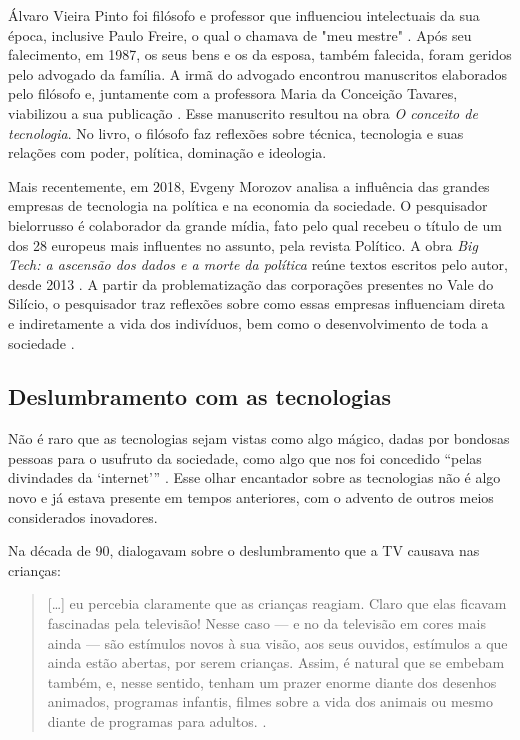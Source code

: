 \documentclass[portuguese]{textolivre}
\begin{document}
Álvaro Vieira Pinto foi filósofo e professor que influenciou intelectuais da sua época, inclusive Paulo Freire, o qual o chamava de "meu mestre" \cite[p. 1]{pinto_o_2005}. Após seu falecimento, em 1987, os seus bens e os da esposa, também falecida, foram geridos pelo advogado da família. A irmã do advogado encontrou manuscritos elaborados pelo filósofo e, juntamente com a professora Maria da Conceição Tavares, viabilizou a sua publicação \cite{pinto_o_2005}. Esse manuscrito resultou na obra \emph{O conceito de tecnologia}. No livro, o filósofo faz reflexões sobre técnica, tecnologia e suas relações com poder, política, dominação e ideologia.

Mais recentemente, em 2018, Evgeny Morozov analisa a influência das grandes empresas de tecnologia na política e na economia da sociedade. O pesquisador bielorrusso é colaborador da grande mídia, fato pelo qual recebeu o título de um dos 28 europeus mais influentes no assunto, pela revista Político. A obra \emph{Big Tech: a ascensão dos dados e a morte da política} reúne textos escritos pelo autor, desde 2013 \cite{morozov2018}. A partir da problematização das corporações presentes no Vale do Silício, o pesquisador traz reflexões sobre como essas empresas influenciam direta e indiretamente a vida dos indivíduos, bem como o desenvolvimento de toda a sociedade \cite{morozov2018}.

\subsection{Deslumbramento com as tecnologias}

Não é raro que as tecnologias sejam vistas como algo mágico, dadas por bondosas pessoas para o usufruto da sociedade, como algo que nos foi concedido “pelas divindades da ‘internet’” \cite[p. 42]{morozov2018}. Esse olhar encantador sobre as tecnologias não é algo novo e já estava presente em tempos anteriores, com o advento de outros meios considerados inovadores.

Na década de 90, \textcite{freire_educar_2011} dialogavam sobre o deslumbramento que a TV causava nas crianças:

\begin{quote}
 […] eu percebia claramente que as crianças reagiam. Claro que elas ficavam fascinadas pela televisão! Nesse caso — e no da televisão em cores mais ainda — são estímulos novos à sua visão, aos seus ouvidos, estímulos a que ainda estão abertas, por serem crianças. Assim, é natural que se embebam também, e, nesse sentido, tenham um prazer enorme diante dos desenhos animados, programas infantis, filmes sobre a vida dos animais ou mesmo diante de programas para adultos. \cite[p. 24]{freire_educar_2011}.
\end{quote}
\end{document}
